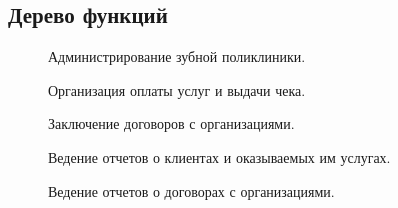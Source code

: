 \documentclass[a4paper,12pt]{article}
\begin{document}
\subsection{Дерево функций}

 \begin{figure}[h]
	\begin{minipage}[h]{1\linewidth}
		\caption{ Администрирование зубной поликлиники.}
	\end{minipage}
\end{figure}
\begin{figure}[h]
	\begin{minipage}[h]{1\linewidth}
	\caption{ Организация оплаты услуг и выдачи чека.}
\end{minipage}


\end{figure}

\newpage


\begin{figure}[h]
	\begin{minipage}[h]{1\linewidth}
		\caption{ Заключение договоров с организациями.}
	\end{minipage}
	


\end{figure}

\begin{figure}[h]

	\begin{minipage}[h]{1\linewidth}
		\caption{ Ведение отчетов о клиентах и оказываемых им услугах.}
	\end{minipage}
	
\end{figure}


\begin{figure}[h]
	\begin{minipage}[h]{1\linewidth}
		\caption{ Ведение отчетов о договорах с организациями.}
	\end{minipage}
\end{figure}
\end{document}

